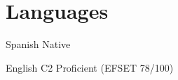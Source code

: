 
\section{Languages}

\langitem
{Spanish}
{Native}

\langitem
{English}
{C2 Proficient (EFSET 78/100)}

